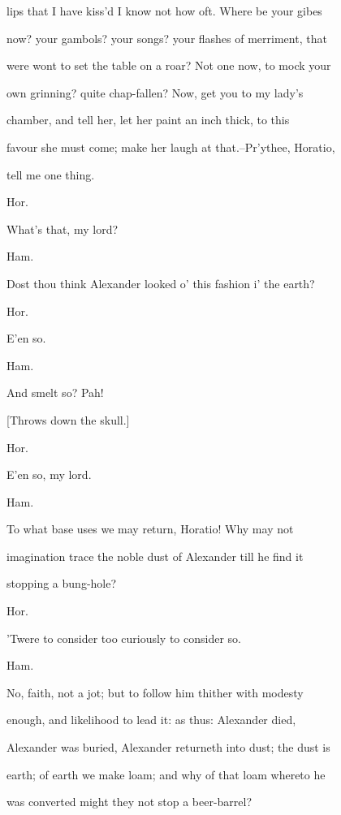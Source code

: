 \documentclass[12pt]{book}
\begin{document}
lips that I have kiss'd I know not how oft. Where be your gibes

now? your gambols? your songs? your flashes of merriment, that

were wont to set the table on a roar? Not one now, to mock your

own grinning? quite chap-fallen? Now, get you to my lady's

chamber, and tell her, let her paint an inch thick, to this

favour she must come; make her laugh at that.--Pr'ythee, Horatio,

tell me one thing.



Hor.

What's that, my lord?



Ham.

Dost thou think Alexander looked o' this fashion i' the earth?



Hor.

E'en so.



Ham.

And smelt so? Pah!



[Throws down the skull.]



Hor.

E'en so, my lord.



Ham.

To what base uses we may return, Horatio! Why may not

imagination trace the noble dust of Alexander till he find it

stopping a bung-hole?



Hor.

'Twere to consider too curiously to consider so.



Ham.

No, faith, not a jot; but to follow him thither with modesty

enough, and likelihood to lead it: as thus: Alexander died,

Alexander was buried, Alexander returneth into dust; the dust is

earth; of earth we make loam; and why of that loam whereto he

was converted might they not stop a beer-barrel?
\end{document}
